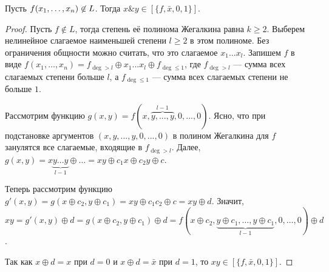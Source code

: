 \begin{lemma} Пусть $f(x_1, \ldots, x_n)\not\in L$. Тогда $x\& y \in [\{f, \bar{x}, 0, 1\}].$
\end{lemma}
\begin{proof} Пусть $f\not\in L$, тогда степень её полинома Жегалкина равна $k \geq 2$. Выберем нелинейное слагаемое наименьшей степени $l\geq 2$ в этом полиноме. Без ограничения общности можно считать, что это слагаемое $x_1...x_l$. Запишем $f$ в виде $f(x_1,\ldots,x_n) = f_{\deg > l} \oplus x_1...x_l \oplus f_{\deg \leq 1}$, где $f_{\deg > l}$ --- сумма всех слагаемых степени больше $l$, а $f_{\deg \leq 1}$ --- сумма всех слагаемых степени не больше $1$.

Рассмотрим функцию $g(x,y) = f(x, \overbrace{y,...,y}^{l-1}, 0,...,0)$. Ясно, что при подстановке аргументов $(x, y,...,y, 0,...,0)$ в полином Жегалкина для $f$ занулятся все слагаемые, входящие в $f_{\deg > l}$. 
Далее, $g(x,y) = x\underbrace{y...y}_{l-1} \oplus \ldots = xy \oplus c_1x \oplus c_2y \oplus c$. 

Теперь рассмотрим функцию $g'(x,y) = g(x\oplus c_2, y\oplus c_1) = xy \oplus c_1c_2 \oplus c = xy \oplus d$. Значит, $xy = g'(x,y) \oplus d = g(x\oplus c_2, y\oplus c_1) \oplus d = f(x \oplus c_2, \underbrace{y\oplus c_1,\ldots,y\oplus c_1}_{l-1},0,\ldots,0)\oplus d$. 

Так как %
$x\oplus d = x$ при $d=0$ и $x\oplus d = \bar{x}$ при $d=1$, то $xy \in [\{f, \bar{x}, 0, 1\}].$
\end{proof}

